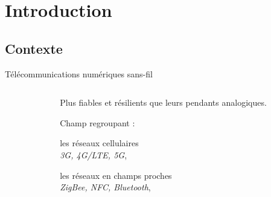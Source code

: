 \documentclass[../main.tex]{subfiles}
\begin{document}
\section{Introduction}

\subsection{Contexte}

\begin{frame}{Télécommunications numériques sans-fil}
  \begin{columns}
    \begin{column}{.4\linewidth}
      \begin{center}
      \end{center}
    \end{column}
    \begin{column}{.6\linewidth}
      \small
      \begin{overlayarea}{\linewidth}{.55\textheight}
        \begin{ctrlitemize}{1em}
          \item Plus fiables et résilients que leurs pendants analogiques.
          \item<2-> Champ regroupant :
          \begin{ctrlitemize}{1ex}
            \scriptsize
            \item<2-> les réseaux cellulaires \\\hspace{1em} \textit{3G, 4G/LTE, 5G},
            \item<3-> les réseaux en champs proches \\\hspace{1em} \textit{ZigBee, NFC, Bluetooth},
          \end{ctrlitemize}
        \end{ctrlitemize}
      \end{overlayarea}
    \end{column}
  \end{columns}
\end{frame}
\end{document}
